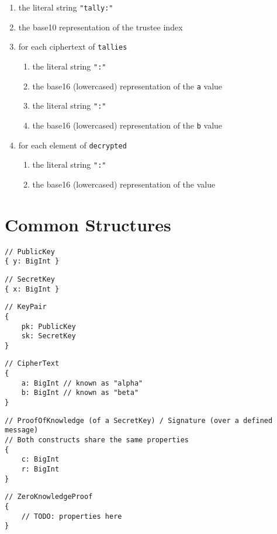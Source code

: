 \begin{enumerate}
  \item the literal string \lstinline[style=ES6]{"tally:"}
  \item the base10 representation of the trustee index
  \item for each ciphertext of \texttt{tallies}
        \begin{enumerate}
          \item the literal string \lstinline[style=ES6]{":"}
          \item the base16 (lowercased) representation of the \texttt{a} value
          \item the literal string \lstinline[style=ES6]{":"}
          \item the base16 (lowercased) representation of the \texttt{b} value
        \end{enumerate}
  \item for each element of \texttt{decrypted}
        \begin{enumerate}
          \item the literal string \lstinline[style=ES6]{":"}
          \item the base16 (lowercased) representation of the value
        \end{enumerate}
\end{enumerate}

\section*{Common Structures}

\label{dt:elgamal:pk}
\begin{lstlisting}[style=ES6]
// PublicKey
{ y: BigInt }
\end{lstlisting}
\vspace*{-0.95em}
\label{dt:elgamal:sk}
\begin{lstlisting}[style=ES6, firstnumber=last]
// SecretKey
{ x: BigInt }
\end{lstlisting}
\vspace*{-0.95em}
\label{dt:elgamal:keypair}
\begin{lstlisting}[style=ES6, firstnumber=last]
// KeyPair
{
    pk: PublicKey
    sk: SecretKey
}
\end{lstlisting}
\vspace*{-0.95em}
\label{dt:elgamal:pok}
\begin{lstlisting}[style=ES6, firstnumber=last]
// CipherText
{
    a: BigInt // known as "alpha"
    b: BigInt // known as "beta"
}
\end{lstlisting}
\vspace*{-0.95em}
\label{dt:elgamal:pok}
\begin{lstlisting}[style=ES6, firstnumber=last]
// ProofOfKnowledge (of a SecretKey) / Signature (over a defined message)
// Both constructs share the same properties
{
    c: BigInt
    r: BigInt
}
\end{lstlisting}
\vspace*{-0.95em}
\label{dt:elgamal:zkp}
\begin{lstlisting}[style=ES6, firstnumber=last]
// ZeroKnowledgeProof
{
    // TODO: properties here
}
\end{lstlisting}



